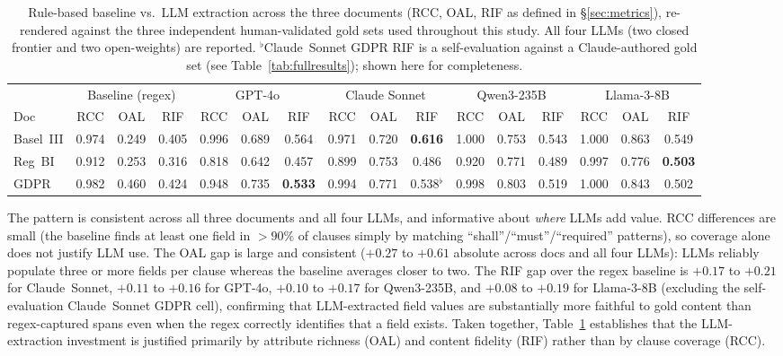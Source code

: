 \documentclass{article}
\begin{document}
\begin{table}[!htbp]
\caption{Rule-based baseline vs.\ LLM extraction across the three
documents (RCC, OAL, RIF as defined in \S\ref{sec:metrics}),
re-rendered against the three independent human-validated gold sets
used throughout this study. All four LLMs (two closed frontier and
two open-weights) are reported.
$^{\flat}$Claude~Sonnet GDPR RIF is a self-evaluation against a
Claude-authored gold set (see Table~\ref{tab:fullresults}); shown
here for completeness.}
\centering
\setlength{\tabcolsep}{2.5pt}
\scriptsize
\begin{tabular}{l|ccc|ccc|ccc|ccc|ccc}
\toprule
 & \multicolumn{3}{c|}{Baseline (regex)} &
   \multicolumn{3}{c|}{GPT-4o} &
   \multicolumn{3}{c|}{Claude Sonnet} &
   \multicolumn{3}{c|}{Qwen3-235B} &
   \multicolumn{3}{c}{Llama-3-8B} \\
Doc & RCC & OAL & RIF & RCC & OAL & RIF & RCC & OAL & RIF & RCC & OAL & RIF & RCC & OAL & RIF \\
\midrule
Basel~III & 0.974 & 0.249 & 0.405 & 0.996 & 0.689 & 0.564 & 0.971 & 0.720 & \textbf{0.616} & 1.000 & 0.753 & 0.543 & 1.000 & 0.863 & 0.549 \\
Reg~BI    & 0.912 & 0.253 & 0.316 & 0.818 & 0.642 & 0.457 & 0.899 & 0.753 & 0.486 & 0.920 & 0.771 & 0.489 & 0.997 & 0.776 & \textbf{0.503} \\
GDPR      & 0.982 & 0.460 & 0.424 & 0.948 & 0.735 & \textbf{0.533} & 0.994 & 0.771 & 0.538$^{\flat}$ & 0.998 & 0.803 & 0.519 & 1.000 & 0.843 & 0.502 \\
\bottomrule
\end{tabular}
\label{tab:baseline}
\end{table}

\noindent
The pattern is consistent across all three documents and all four
LLMs, and informative about \emph{where} LLMs add value. RCC
differences are small (the baseline finds at least one field in
$> 90\%$ of clauses simply by matching ``shall''/``must''/``required''
patterns), so coverage alone does not justify LLM use. The OAL gap
is large and consistent ($+0.27$ to $+0.61$ absolute across docs and
all four LLMs): LLMs reliably populate three or more fields per
clause whereas the baseline averages closer to two. The RIF gap
over the regex baseline is $+0.17$ to $+0.21$ for Claude~Sonnet,
$+0.11$ to $+0.16$ for GPT-4o, $+0.10$ to $+0.17$ for Qwen3-235B,
and $+0.08$ to $+0.19$ for Llama-3-8B (excluding the self-evaluation
Claude~Sonnet GDPR cell), confirming that LLM-extracted field values
are substantially more faithful to gold content than regex-captured
spans even when the regex correctly identifies that a field exists. Taken together,
Table~\ref{tab:baseline} establishes that the LLM-extraction
investment is justified primarily by attribute richness (OAL) and
content fidelity (RIF) rather than by clause coverage (RCC).
\end{document}
